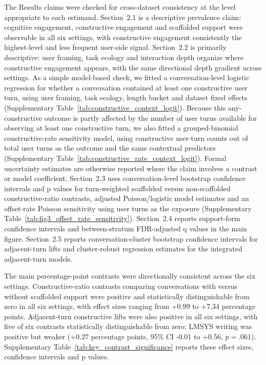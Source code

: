 The Results claims were checked for cross-dataset consistency at the level appropriate to each estimand. Section~2.1 is a descriptive prevalence claim: cognitive engagement, constructive engagement and scaffolded support were observable in all six settings, with constructive engagement consistently the highest-level and less frequent user-side signal. Section~2.2 is primarily descriptive: user framing, task ecology and interaction depth organize where constructive engagement appears, with the same directional depth gradient across settings. As a simple model-based check, we fitted a conversation-level logistic regression for whether a conversation contained at least one constructive user turn, using user framing, task ecology, length bucket and dataset fixed effects (Supplementary Table~\ref{tab:constructive_context_logit}). Because this any-constructive outcome is partly affected by the number of user turns available for observing at least one constructive turn, we also fitted a grouped-binomial constructive-rate sensitivity model, using constructive user-turn counts out of total user turns as the outcome and the same contextual predictors (Supplementary Table~\ref{tab:constructive_rate_context_logit}). Formal uncertainty estimates are otherwise reported where the claim involves a contrast or model coefficient. Section~2.3 uses conversation-level bootstrap confidence intervals and p values for turn-weighted scaffolded versus non-scaffolded constructive-ratio contrasts, adjusted Poisson/logistic model estimates and an offset-rate Poisson sensitivity using user turns as the exposure (Supplementary Table~\ref{tab:fig3_offset_rate_sensitivity}). Section~2.4 reports support-form confidence intervals and between-stratum FDR-adjusted q values in the main figure. Section~2.5 reports conversation-cluster bootstrap confidence intervals for adjacent-turn lifts and cluster-robust regression estimates for the integrated adjacent-turn models.

The main percentage-point contrasts were directionally consistent across the six settings. Constructive-ratio contrasts comparing conversations with versus without scaffolded support were positive and statistically distinguishable from zero in all six settings, with effect sizes ranging from +0.99 to +7.34 percentage points. Adjacent-turn constructive lifts were also positive in all six settings, with five of six contrasts statistically distinguishable from zero; LMSYS writing was positive but weaker (+0.27 percentage points, 95\% CI -0.01 to +0.56, $p=.061$). Supplementary Table~\ref{tab:key_contrast_significance} reports these effect sizes, confidence intervals and p values.

